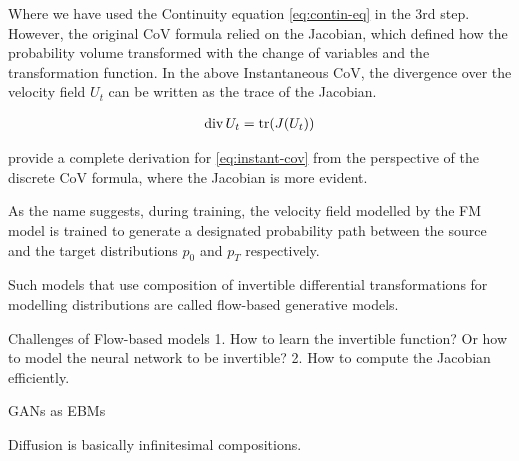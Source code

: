 \documentclass[a4paper, 11pt]{article}
\begin{document}
Where we have used the Continuity equation \eqref{eq:contin-eq} in the 3rd step. However, the original CoV formula relied on the Jacobian, which defined how the probability volume transformed with the change of variables and the transformation function. In the above Instantaneous CoV, the divergence over the velocity field $U_t$ can be written as the trace of the Jacobian.

\begin{align}
    \text{div}\, U_t = \mbox{$\mbox{tr}$}(J(U_t))
\end{align}

\cite{chen2018neural} provide a complete derivation for \eqref{eq:instant-cov} from the perspective of the discrete CoV formula, where the Jacobian is more evident.


As the name suggests, during training, the velocity field modelled by the FM model is trained to generate a designated probability path between the source and the target distributions $p_0$ and $p_T$ respectively.


Such models that use composition of invertible differential transformations for modelling distributions are called flow-based generative models.

Challenges of Flow-based models 1. How to learn the invertible function? Or how to model the neural network to be invertible? 2. How to compute the Jacobian efficiently.


GANs as EBMs

\begin{center} 
\end{center} 


Diffusion is basically infinitesimal compositions.
\end{document}
